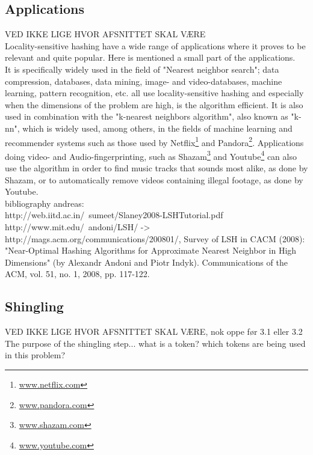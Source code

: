 \subsection{Applications}
VED IKKE LIGE HVOR AFSNITTET SKAL VÆRE\\
Locality-sensitive hashing have a wide range of applications where it proves to be relevant and quite popular. Here is mentioned a small part of the applications.  \\
It is specifically widely used in the field of "Nearest neighbor search"; data compression, databases, data mining, image- and video-databases, machine learning, pattern recognition, etc. all use locality-sensitive hashing and especially when the dimensions of the problem are high, is the algorithm efficient. 
It is also used in combination with the "k-nearest neighbors algorithm", also known as "k-nn", which is widely used, among others, in the fields of machine learning and recommender systems such as those used by Netflix\footnote{\url{www.netflix.com}} and Pandora\footnote{\url{www.pandora.com}}. Applications doing video- and Audio-fingerprinting, such as Shazam\footnote{\url{www.shazam.com}} and Youtube\footnote{\url{www.youtube.com}} can also use the algorithm in order to find music tracks that sounds most alike, as done by Shazam, or to automatically remove videos containing illegal footage, as done by Youtube.
\\
bibliography andreas: \\
http://web.iitd.ac.in/~sumeet/Slaney2008-LSHTutorial.pdf \\
http://www.mit.edu/~andoni/LSH/ -> http://mags.acm.org/communications/200801/, Survey of LSH in CACM (2008): "Near-Optimal Hashing Algorithms for Approximate Nearest Neighbor in High Dimensions" (by Alexandr Andoni and Piotr Indyk). Communications of the ACM, vol. 51, no. 1, 2008, pp. 117-122.

\subsection{Shingling}
VED IKKE LIGE HVOR AFSNITTET SKAL VÆRE, nok oppe før 3.1 eller 3.2\\
The purpose of the shingling step... what is a token? which tokens are being used in this problem?

